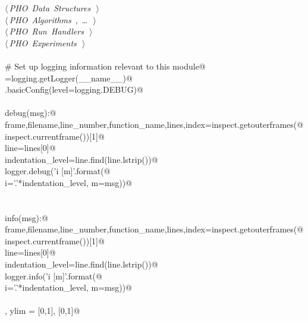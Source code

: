 \documentclass[10.0pt]{report}
\begin{document}
\begin{appendices}
\begin{flushleft}
\begin{list}{}{}
\mbox{}\verb@@\hbox{$\langle\,${\itshape PHO Data Structures}\nobreak\ {\footnotesize {}}$\,\rangle$}\verb@@\\
\mbox{}\verb@@\hbox{$\langle\,${\itshape PHO Algorithms}\nobreak\ {\footnotesize {}, \ldots\ }$\,\rangle$}\verb@@\\
\mbox{}\verb@@\hbox{$\langle\,${\itshape PHO Run Handlers}\nobreak\ {\footnotesize {}}$\,\rangle$}\verb@@\\
\mbox{}\verb@@\hbox{$\langle\,${\itshape PHO Experiments}\nobreak\ {\footnotesize {}}$\,\rangle$}\verb@@\\
\mbox{}\verb@@\\
\mbox{}\verb@# Set up logging information relevant to this module@\\
\mbox{}\verb@logger=logging.getLogger(__name__)@\\
\mbox{}\verb@logging.basicConfig(level=logging.DEBUG)@\\
\mbox{}\verb@@\\
\mbox{}\verb@def debug(msg):@\\
\mbox{}\verb@    frame,filename,line_number,function_name,lines,index=inspect.getouterframes(@\\
\mbox{}\verb@        inspect.currentframe())[1]@\\
\mbox{}\verb@    line=lines[0]@\\
\mbox{}\verb@    indentation_level=line.find(line.lstrip())@\\
\mbox{}\verb@    logger.debug('{i} [{m}]'.format(@\\
\mbox{}\verb@        i='.'*indentation_level, m=msg))@\\
\mbox{}\verb@@\\
\mbox{}\verb@@\\
\mbox{}\verb@def info(msg):@\\
\mbox{}\verb@    frame,filename,line_number,function_name,lines,index=inspect.getouterframes(@\\
\mbox{}\verb@        inspect.currentframe())[1]@\\
\mbox{}\verb@    line=lines[0]@\\
\mbox{}\verb@    indentation_level=line.find(line.lstrip())@\\
\mbox{}\verb@    logger.info('{i} [{m}]'.format(@\\
\mbox{}\verb@        i='.'*indentation_level, m=msg))@\\
\mbox{}\verb@@\\
\mbox{}\verb@xlim, ylim = [0,1], [0,1]@\\

\end{list}
\end{flushleft}
\end{appendices}
\end{document}
